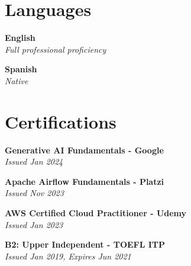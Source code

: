 \documentclass[letterpaper,11pt]{article}
\begin{document}

\section{Languages}
  \begin{itemize}[leftmargin=0.15in, label={}]
    \small{\item{
     \textbf{English} \\
     \textit{Full professional proficiency} \\
    }}
    \small{\item{
     \textbf{Spanish} \\
     \textit{Native} \\
    }}
 \end{itemize}

 
\section{Certifications}
  \begin{itemize}[leftmargin=0.15in, label={}]
  \small{\item{
     \textbf{Generative AI Fundamentals - Google} \\
     \textit{Issued Jan 2024} \\
    }}
    \small{\item{
     \textbf{Apache Airflow Fundamentals - Platzi} \\
     \textit{Issued Nov 2023} \\
    }}
    \small{\item{
     \textbf{AWS Certified Cloud Practitioner - Udemy} \\
     \textit{Issued Jan 2023} \\
    }}
    \small{\item{
     \textbf{B2: Upper Independent - TOEFL ITP} \\
     \textit{Issued Jan 2019, Expires Jun 2021} \\
    }}
 \end{itemize}


\end{document}
